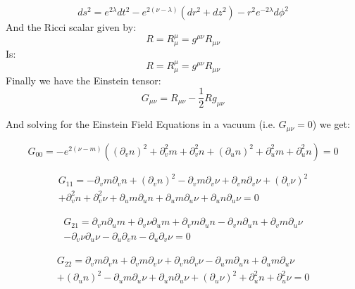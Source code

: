 \documentclass{article}
\begin{document}
\begin{equation}
ds^{2}=e^{2\lambda}dt^{2}-e^{2\left(\nu-\lambda\right)}\left(dr^{2}+dz^{2}\right)-r^{2}e^{-2\lambda}d\phi^{2}
\end{equation}
And the Ricci scalar given by:
\begin{equation}
R=R_{\mu}^{\mu}=g^{\mu\nu}R_{\mu\nu}
\end{equation}
Is:
\begin{equation}
R=R_{\mu}^{\mu}=g^{\mu\nu}R_{\mu\nu}
\end{equation}
Finally we have the Einstein tensor:
\begin{equation}
G_{\mu\nu}=R_{\mu\nu}-\frac{1}{2}Rg_{\mu\nu}
\end{equation}

And solving for the Einstein Field Equations in a vacuum (i.e. $G_{\mu\nu}=0$)
we get:

\begin{equation}
G_{00}=-e^{2(\nu-m)}\left(\left(\partial_{v}n\right)^{2}+\partial_{v}^{2}m+\partial_{v}^{2}n+\left(\partial_{u}n\right)^{2}+\partial_{u}^{2}m+\partial_{u}^{2}n\right)=0\label{eq:G00}
\end{equation}

\begin{equation}
\begin{split}
G_{11}=-\partial_{v}m\partial_{v}n+\left(\partial_{v}n\right)^{2}-\partial_{v}m\partial_{v}\nu+\partial_{v}n\partial_{v}\nu+\left(\partial_{v}\nu\right)^{2}\\
+\partial_{v}^{2}n+\partial_{v}^{2}\nu+\partial_{u}m\partial_{u}n+\partial_{u}m\partial_{u}\nu+\partial_{u}n\partial_{u}\nu=0
\end{split}
\end{equation}


\begin{equation}
\begin{split}
G_{21}=\partial_{v}n\partial_{u}m+\partial_{v}\nu\partial_{u}m+\partial_{v}m\partial_{u}n-\partial_{v}n\partial_{u}n+\partial_{v}m\partial_{u}\nu\\
-\partial_{v}\nu\partial_{u}\nu-\partial_{u}\partial_{v}n-\partial_{u}\partial_{v}\nu=0
\end{split}
\end{equation}


\begin{equation}
\begin{split}
G_{22}=\partial_{v}m\partial_{v}n+\partial_{v}m\partial_{v}\nu+\partial_{v}n\partial_{v}\nu-\partial_{u}m\partial_{u}n+\partial_{u}m\partial_{u}\nu\\
+\left(\partial_{u}n\right)^{2}-\partial_{u}m\partial_{u}\nu+\partial_{u}n\partial_{u}\nu+\left(\partial_{u}\nu\right)^{2}+\partial_{u}^{2}n+\partial_{u}^{2}\nu=0
\end{split}
\end{equation}
\end{document}
